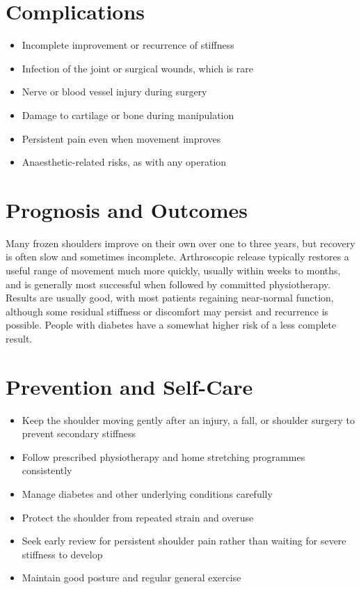 \section*{Complications}
\begin{itemize}
    \item Incomplete improvement or recurrence of stiffness
    \item Infection of the joint or surgical wounds, which is rare
    \item Nerve or blood vessel injury during surgery
    \item Damage to cartilage or bone during manipulation
    \item Persistent pain even when movement improves
    \item Anaesthetic-related risks, as with any operation
\end{itemize}

\section*{Prognosis and Outcomes}
Many frozen shoulders improve on their own over one to three years, but recovery is often slow and sometimes incomplete. Arthroscopic release typically restores a useful range of movement much more quickly, usually within weeks to months, and is generally most successful when followed by committed physiotherapy. Results are usually good, with most patients regaining near-normal function, although some residual stiffness or discomfort may persist and recurrence is possible. People with diabetes have a somewhat higher risk of a less complete result.

\section*{Prevention and Self-Care}
\begin{itemize}
    \item Keep the shoulder moving gently after an injury, a fall, or shoulder surgery to prevent secondary stiffness
    \item Follow prescribed physiotherapy and home stretching programmes consistently
    \item Manage diabetes and other underlying conditions carefully
    \item Protect the shoulder from repeated strain and overuse
    \item Seek early review for persistent shoulder pain rather than waiting for severe stiffness to develop
    \item Maintain good posture and regular general exercise
\end{itemize}

